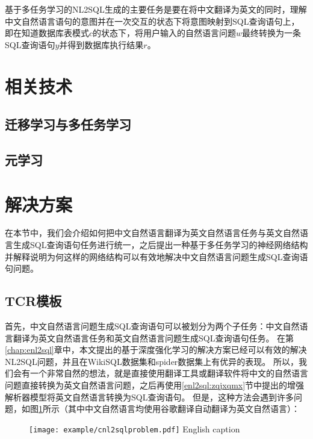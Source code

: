 基于多任务学习的NL2SQL生成的主要任务是要在将中文翻译为英文的同时，理解中文自然语言语句的意图并在一次交互的状态下将意图映射到SQL查询语句上，
即在知道数据库表模式$c$的状态下，将用户输入的自然语言问题$w$最终转换为一条SQL查询语句$y$并得到数据库执行结果$r$。

\section{相关技术}
\subsection{迁移学习与多任务学习}
\subsection{元学习}

\section{解决方案}

在本节中，我们会介绍如何把中文自然语言翻译为英文自然语言任务与英文自然语言生成SQL查询语句任务进行统一，之后提出一种基于多任务学习的神经网络结构并解释说明为何这样的网络结构可以有效地解决中文自然语言问题生成SQL查询语句问题。

\subsection{TCR模板}

首先，中文自然语言问题生成SQL查询语句可以被划分为两个子任务：中文自然语言翻译为英文自然语言任务和英文自然语言问题生成SQL查询语句任务。
在第\ref{chap:enl2sql}章中，本文提出的基于深度强化学习的解决方案已经可以有效的解决NL2SQL问题，并且在WikiSQL数据集和spider数据集上有优异的表现。
所以，我们会有一个非常自然的想法，就是直接使用翻译工具或翻译软件将中文的自然语言问题直接转换为英文自然语言问题，之后再使用\ref{enl2sql:zqjxqmx}节中提出的增强解析器模型将英文自然语言转换为SQL查询语句。
但是，这种方法会遇到许多问题，如图\ref{fig:cnl2sqlproblem}所示（其中中文自然语言均使用谷歌翻译自动翻译为英文自然语言）：

\begin{figure}[!htp]
    \centering
    \texttt{[image: example/cnl2sqlproblem.pdf]}
      {English caption}
    \label{fig:cnl2sqlproblem}
  \end{figure}

